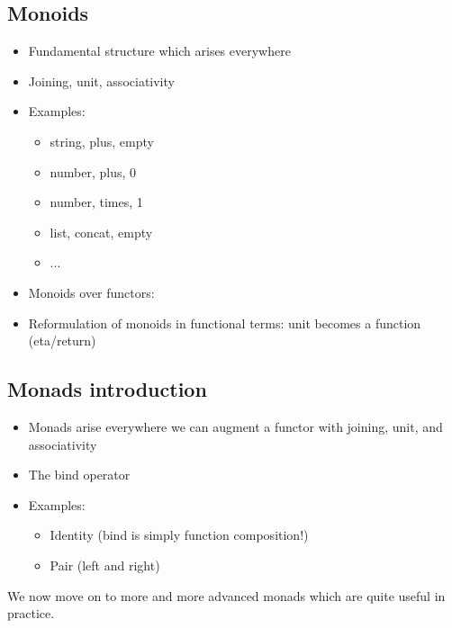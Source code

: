 \documentclass{article}
\begin{document}
\subsection{Monoids}\label{monoids}

\begin{itemize}[noitemsep]

	\item
	Fundamental structure which arises everywhere
	\item
	Joining, unit, associativity
	\item
	Examples:
	
	\begin{itemize}[noitemsep]

		\item
		string, plus, empty
		\item
		number, plus, 0
		\item
		number, times, 1
		\item
		list, concat, empty
		\item
		...
	\end{itemize}
	\item
	Monoids over functors:
	\item
	Reformulation of monoids in functional terms: unit becomes a function
	(eta/return)
\end{itemize}

\subsection{Monads introduction}\label{monads-introduction}

\begin{itemize}[noitemsep]

	\item
	Monads arise everywhere we can augment a functor with joining, unit,
	and associativity
	\item
	The bind operator
	\item
	Examples:
	
	\begin{itemize}[noitemsep]

		\item
		Identity (bind is simply function composition!)
		\item
		Pair (left and right)
	\end{itemize}
\end{itemize}

We now move on to more and more advanced monads which are quite useful
in practice.
\end{document}
